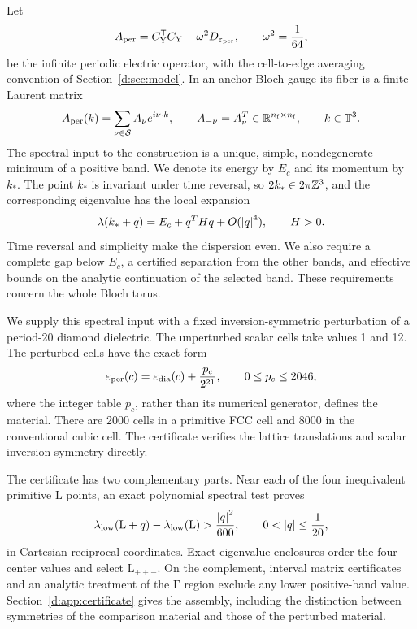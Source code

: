 Let
\begin{equation}
 A_{\rm per}
   = C_{\rm Y}^{\mathsf T}C_{\rm Y}-\omega^2D_{\varepsilon_{\rm per}},
 \qquad \omega^2=\frac1{64},
 \label{d:eq:physical-periodic-operator}
\end{equation}
be the infinite periodic electric operator, with the cell-to-edge averaging
convention of Section~\ref{d:sec:model}. In an anchor Bloch gauge its fiber is
a finite Laurent matrix
\begin{equation}
 A_{\rm per}(k)=\sum_{\nu\in\mathcal S}A_\nu e^{i\nu\cdot k},
 \qquad A_{-\nu}=A_\nu^T\in\mathbb R^{n_{\rm f}\times n_{\rm f}},
 \qquad k\in\mathbb T^3.
 \label{d:eq:physical-laurent-fiber}
\end{equation}
The spectral input to the construction is a unique, simple, nondegenerate
minimum of a positive band. We denote its energy by \(E_c\) and its momentum
by \(k_*\). The point \(k_*\) is invariant under time reversal, so
\(2k_*\in2\pi\mathbb Z^3\), and the corresponding eigenvalue has the local expansion
\begin{equation}
 \lambda(k_*+q)
   =E_c+q^THq+O(\left\lvert q\right\rvert^4),
 \qquad H>0.
 \label{d:eq:physical-edge-expansion}
\end{equation}
Time reversal and simplicity make the dispersion even. We also require a
complete gap below \(E_c\), a certified separation from the other bands,
and effective bounds on the analytic continuation of the selected band.
These requirements concern the whole Bloch torus.

We supply this spectral input with a fixed inversion-symmetric perturbation
of a period-20 diamond dielectric. The unperturbed scalar cells take values
1 and 12. The perturbed cells have the exact form
\begin{equation}
 \varepsilon_{\mathrm{per}}(c)
   =\varepsilon_{\rm dia}(c)+\frac{p_c}{2^{21}},
 \qquad 0\le p_c\le2046,
 \label{d:eq:physical-exact-material}
\end{equation}
where the integer table \(p_c\), rather than its numerical generator,
defines the material. There are 2000 cells in a primitive FCC cell and
8000 in the conventional cubic cell. The certificate verifies the lattice
translations and scalar inversion symmetry directly.

The certificate has two complementary parts. Near each of the four
inequivalent primitive \(\mathrm{L}\) points, an exact polynomial spectral test proves
\begin{equation}
 \lambda_{\mathrm{low}}(\mathrm{L}+q)-\lambda_{\mathrm{low}}(\mathrm{L})
   >\frac{\left\lvert q\right\rvert^2}{600},
 \qquad 0<\left\lvert q\right\rvert\le\frac1{20},
 \label{d:eq:physical-local-minimum}
\end{equation}
in Cartesian reciprocal coordinates. Exact eigenvalue enclosures order the
four center values and select \(\mathrm{L}_{++-}\). On the complement, interval
matrix certificates and an analytic treatment of the \(\mathrm{\Gamma}\) region
exclude any lower positive-band value. Section~\ref{d:app:certificate}
gives the assembly, including the distinction between symmetries of the
comparison material and those of the perturbed material.

